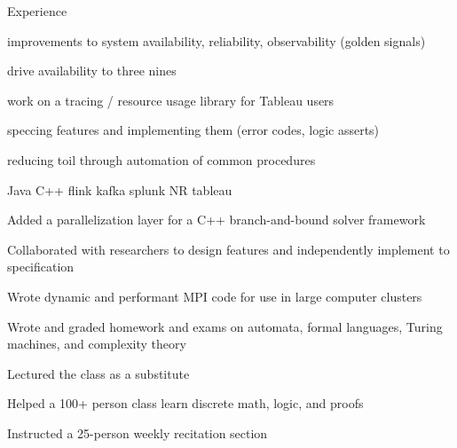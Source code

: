 \documentclass{cv}
\begin{document}

\begin{cvsection}{Experience}
  {
    \item improvements to system availability, reliability, observability (golden signals)
    \item drive availability to three nines
    \item work on a tracing / resource usage library for Tableau users
    \item speccing features and implementing them (error codes, logic asserts)
    \item reducing toil through automation of common procedures
    \item Java C++ flink kafka splunk NR tableau
  }
  {
    \item Added a parallelization layer for a C++ branch-and-bound solver framework
    \item Collaborated with researchers to design features and independently implement to specification
    \item Wrote dynamic and performant MPI code for use in large computer clusters
  }
  {
    \item Wrote and graded homework and exams on automata, formal languages, Turing machines, and complexity theory
    \item Lectured the class as a substitute
  }
  {
    \item Helped a 100+ person class learn discrete math, logic, and proofs
    \item Instructed a 25-person weekly recitation section
  }
\end{cvsection}
\end{document}
